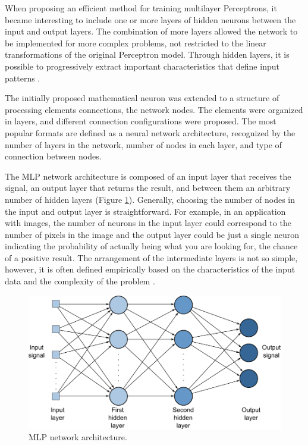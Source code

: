 When proposing an efficient method for training multilayer Perceptrons, it became interesting to include one or more layers of hidden neurons between the input and output layers. The combination of more layers allowed the network to be implemented for more complex problems, not restricted to the linear transformations of the original Perceptron model. Through hidden layers, it is possible to progressively extract important characteristics that define input patterns \cite{haykin1999}.

The initially proposed mathematical neuron was extended to a structure of processing elements connections, the network nodes. The elements were organized in layers, and different connection configurations were proposed. The most popular formats are defined as a neural network architecture, recognized by the number of layers in the network, number of nodes in each layer, and type of connection between nodes.

The MLP network architecture is composed of an input layer that receives the signal, an output layer that returns the result, and between them an arbitrary number of hidden layers (Figure \ref{fig:figure108}). Generally, choosing the number of nodes in the input and output layer is straightforward. For example, in an application with images, the number of neurons in the input layer could correspond to the number of pixels in the image and the output layer could be just a single neuron indicating the probability of actually being what you are looking for, the chance of a positive result. The arrangement of the intermediate layers is not so simple, however, it is often defined empirically based on the characteristics of the input data and the complexity of the problem \cite{braga1998fundamentos}.

\begin{figure}
    \centering
    \includegraphics[scale=0.65]{images/figure108.png}
    \caption{MLP network architecture.}
    \label{fig:figure108}
\end{figure}

